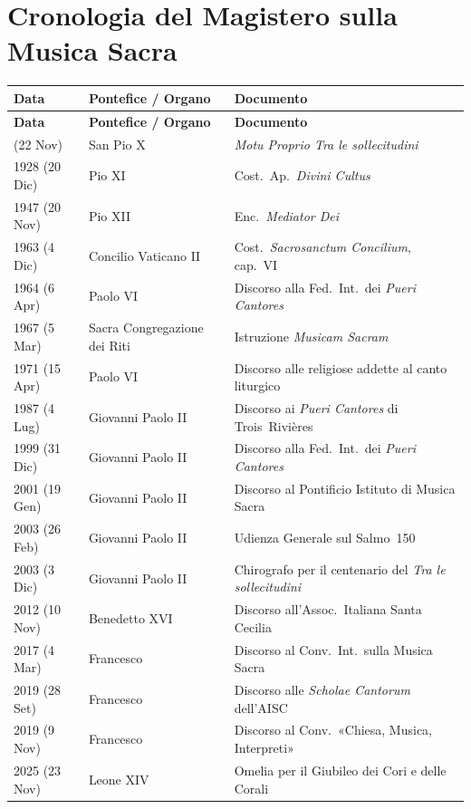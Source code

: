 \documentclass[12pt,a4paper]{article}
\begin{document}
	\newpage
	\appendix
	
	\section{Cronologia del Magistero sulla Musica Sacra}
	
	\begin{longtable}{L{3cm}L{4.5cm}L{7cm}}
		\toprule
		\textbf{Data} & \textbf{Pontefice / Organo} & \textbf{Documento} \\
		\midrule
		\endfirsthead
		\toprule
		\textbf{Data} & \textbf{Pontefice / Organo} & \textbf{Documento} \\
		\midrule
		\endhead
		\bottomrule
		 (22 Nov) & San Pio X & \emph{Motu Proprio Tra le sollecitudini} \\
		1928 (20 Dic) & Pio XI & Cost.~Ap.\ \emph{Divini Cultus} \\
		1947 (20 Nov) & Pio XII & Enc.\ \emph{Mediator Dei} \\
		1963 (4 Dic) & Concilio Vaticano II & Cost.\ \emph{Sacrosanctum Concilium}, cap.~VI \\
		1964 (6 Apr) & Paolo VI & Discorso alla Fed.\ Int.\ dei \emph{Pueri Cantores} \\
		1967 (5 Mar) & Sacra Congregazione dei Riti & Istruzione \emph{Musicam Sacram} \\
		1971 (15 Apr) & Paolo VI & Discorso alle religiose addette al canto liturgico \\
		1987 (4 Lug) & Giovanni Paolo II & Discorso ai \emph{Pueri Cantores} di Trois~Rivières \\
		1999 (31 Dic) & Giovanni Paolo II & Discorso alla Fed.\ Int.\ dei \emph{Pueri Cantores} \\
		2001 (19 Gen) & Giovanni Paolo II & Discorso al Pontificio Istituto di Musica Sacra \\
		2003 (26 Feb) & Giovanni Paolo II & Udienza Generale sul Salmo~150 \\
		2003 (3 Dic) & Giovanni Paolo II & Chirografo per il centenario del \emph{Tra le sollecitudini} \\
		2012 (10 Nov) & Benedetto XVI & Discorso all'Assoc.\ Italiana Santa Cecilia \\
		2017 (4 Mar) & Francesco & Discorso al Conv.\ Int.\ sulla Musica Sacra \\
		2019 (28 Set) & Francesco & Discorso alle \emph{Scholae Cantorum} dell'AISC \\
		2019 (9 Nov) & Francesco & Discorso al Conv.\ «Chiesa, Musica, Interpreti» \\
		2025 (23 Nov) & Leone XIV & Omelia per il Giubileo dei Cori e delle Corali \\
	\end{longtable}
	
\end{document}
